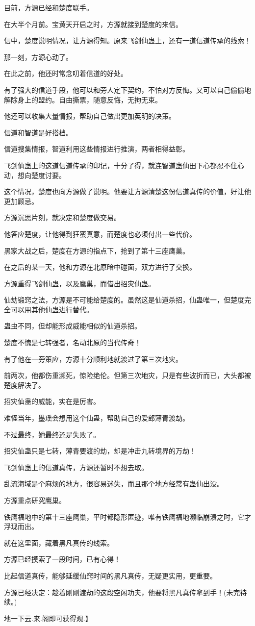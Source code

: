 \begin{this_body}
目前，方源已经和楚度联手。

在大半个月前。宝黄天开启之时，方源就接到楚度的来信。

信中，楚度说明情况，让方源得知。原来飞剑仙蛊上，还有一道信道传承的线索！

那一刻，方源心动了。

在此之前，他还时常念叨着信道的好处。

有了强大的信道手段，他可以和旁人定下契约，不怕对方反悔。又可以自己偷偷地解除身上的盟约。自由撕票，随意反悔，无拘无束。

他还可以收集大量情报，帮助自己做出更加英明的决策。

信道和智道是好搭档。

信道搜集情报，智道利用这些情报进行推演，两者相得益彰。

飞剑仙蛊上的这道信道传承的印记，十分了得，就连智道蛊仙田下心都忍不住心动，想向楚度讨要。

这个情况，楚度也向方源做了说明。他要让方源清楚这份信道真传的价值，好让他更加顾忌。

方源沉思片刻，就决定和楚度做交易。

他答应楚度，让他得到狂蛮真意，而楚度也必须付出一些代价。

黑家大战之后，楚度在方源的指点下，抢到了第十三座鹰巢。

在之后的某一天，他和方源在北原暗中碰面，双方进行了交换。

方源重得飞剑仙蛊，以及鹰巢，而借出招灾仙蛊。

仙劫锻窍之法，方源是不可能给楚度的。虽然这是仙道杀招，仙蛊唯一，但楚度完全可以用其他仙蛊进行替代。

蛊虫不同，但却能形成威能相似的仙道杀招。

楚度不愧是七转强者，名动北原的当代传奇！

有了他在一旁策应，方源十分顺利地就渡过了第三次地灾。

前两次，他都伤重濒死，惊险绝伦。但第三次地灾，只是有些波折而已，大头都被楚度解决了。

招灾仙蛊的威能，实在是厉害。

难怪当年，墨瑶会想用这个仙蛊，帮助自己的爱郎薄青渡劫。

不过最终，她最终还是失败了。

招灾仙蛊只是七转，薄青要渡的劫，却是冲击九转境界的万劫！

飞剑仙蛊上的信道真传，方源还暂时不想去取。

乱流海域是个麻烦的地方，很容易迷失，而且那个地方经常有蛊仙出没。

方源重点研究鹰巢。

铁鹰福地中的第十三座鹰巢，平时都隐形匿迹，唯有铁鹰福地濒临崩溃之时，它才浮现而出。

就在这里面，藏着黑凡真传的线索。

方源已经摸索了一段时间，已有心得！

比起信道真传，能够延缓仙窍时间的黑凡真传，无疑更实用，更重要。

方源已经决定：趁着刚刚渡劫的这段空闲功夫，他要将黑凡真传拿到手！(未完待续。)

地一下云.来.阁即可获得观.】

\end{this_body}

